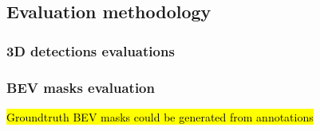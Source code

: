 \subsection{Evaluation methodology}
\label{evaluacion}

\subsubsection{3D detections evaluations}
\subsubsection{BEV masks evaluation}
\hl{Groundtruth BEV masks could be generated from annotations}


